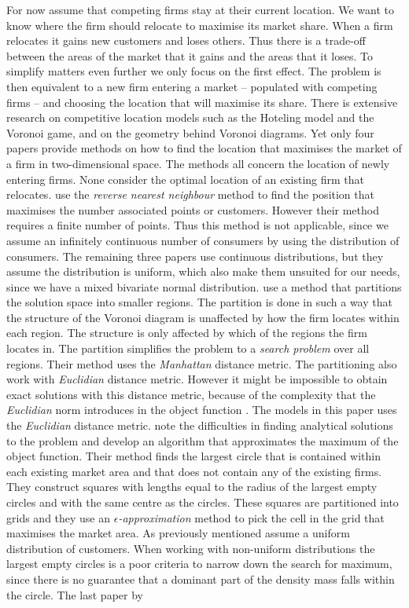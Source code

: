 \documentclass[preprint, 12pt]{elsarticle}
\begin{document}
For now assume that competing firms stay at their current location. We want to know where the firm should relocate to maximise its market share. When a firm relocates it gains new customers and loses others. Thus there is a trade-off between the areas of the market that it gains and the areas that it loses. To simplify matters even further we only focus on the first effect. The problem is then equivalent to a new firm entering a market -- populated with competing firms -- and choosing the location that will maximise its share. There is extensive research on competitive location models such as the Hoteling model and the Voronoi game, and on the geometry behind Voronoi diagrams. Yet only four papers provide methods on how to find the location that maximises the market of a firm in two-dimensional space. The methods all concern the location of newly entering firms. None consider the optimal location of an existing firm that relocates. \citet{Cabello_Diaz-Banez_Langerman_Seara_Ventura_2010} use the \emph{reverse nearest neighbour} method to find the position that maximises the number associated points or customers. However their method requires a finite number of points. Thus this method is not applicable, since we assume an infinitely continuous number of consumers by using the distribution of consumers. The remaining three papers use continuous distributions, but they assume the distribution is uniform, which also make them unsuited for our needs, since we have a mixed bivariate normal distribution. \citet{Averbakh_Berman_Kalcsics_Krass_2015} use a method that partitions the solution space into smaller regions. The partition is done in such a way that the structure of the Voronoi diagram is unaffected by how the firm locates within each region. The structure is only affected by which of the regions the firm locates in. The partition simplifies the problem to a \emph{search problem} over all regions. Their method uses the \emph{Manhattan} distance metric. The partitioning also work with \emph{Euclidian} distance metric. However it might be impossible to obtain exact solutions with this distance metric, because of the complexity that the \emph{Euclidian} norm introduces in the object function \citep[pp.~409-410]{Averbakh_Berman_Kalcsics_Krass_2015}. The models in this paper uses the \emph{Euclidian} distance metric. \citet{Cheong_Efrat_Har-Peled_2007} note the difficulties in finding analytical solutions to the problem and develop an algorithm that approximates the maximum of the object function. Their method finds the largest circle that is contained within each existing market area and that does not contain any of the existing firms. They construct squares with lengths equal to the radius of the largest empty circles and with the same centre as the circles. These squares are partitioned into grids and they use an \emph{$\epsilon$-approximation} method to pick the cell in the grid that maximises the market area. As previously mentioned \citet{Cheong_Efrat_Har-Peled_2007} assume a uniform distribution of customers. When working with non-uniform distributions the largest empty circles is a poor criteria to narrow down the search for maximum, since there is no guarantee that a dominant part of the density mass falls within the circle. The last paper by 
\end{document}
